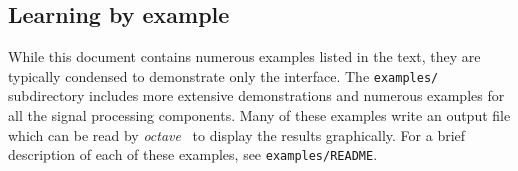 
\subsection{Learning by example}
\label{section:learning_by_example}
While this document contains numerous examples listed in the text, they are
typically condensed to demonstrate only the interface.
The {\tt examples/} subdirectory includes more extensive demonstrations and
numerous examples for all the signal processing components.
Many of these examples write an output file which can be read by
{\em octave}~\cite{octave:web} to display the results graphically.
For a brief description of each of these examples, see {\tt examples/README}.

